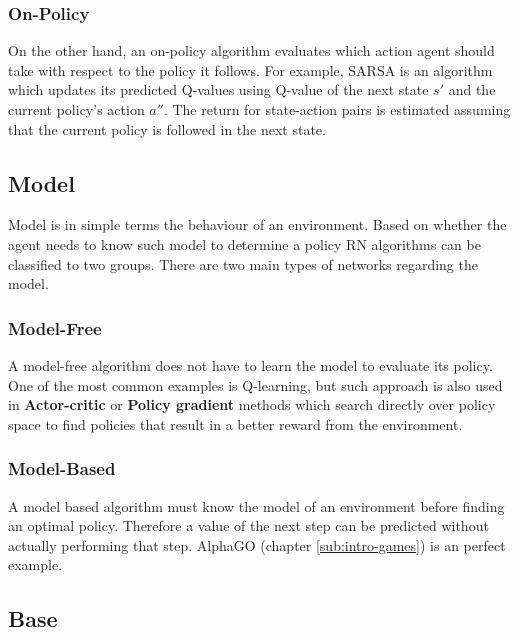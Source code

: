 \subsubsection*{On-Policy}
\label{sub2:on-policy}

On the other hand, an on-policy algorithm evaluates which action agent should take with respect to the policy it follows. For example, SARSA is an algorithm which updates its predicted Q-values using Q-value of the next state $s'$ and the current policy's action $a''$. The return for state-action pairs is estimated assuming that the current policy is followed in the next state.

\subsection{Model}
\label{sub:model}

Model is in simple terms the behaviour of an environment. Based on whether the agent needs to know such model to determine a policy RN algorithms can be classified to two groups. There are two main types of networks regarding the model.

\subsubsection*{Model-Free}
\label{sub2:model-free}

A model-free algorithm does not have to learn the model to evaluate its policy. One of the most common examples is Q-learning, but such approach is also used in \textbf{Actor-critic} or \textbf{Policy gradient} methods which search directly over policy space to find policies that result in a better reward from the environment.

\subsubsection*{Model-Based}
\label{sub2:model-based}

A model based algorithm must know the model of an environment before finding an optimal policy. Therefore a value of the next step can be predicted without actually performing that step. \mbox{AlphaGO} (chapter \ref{sub:intro-games}) is an perfect example.

\subsection{Base}
\label{sub:base}

